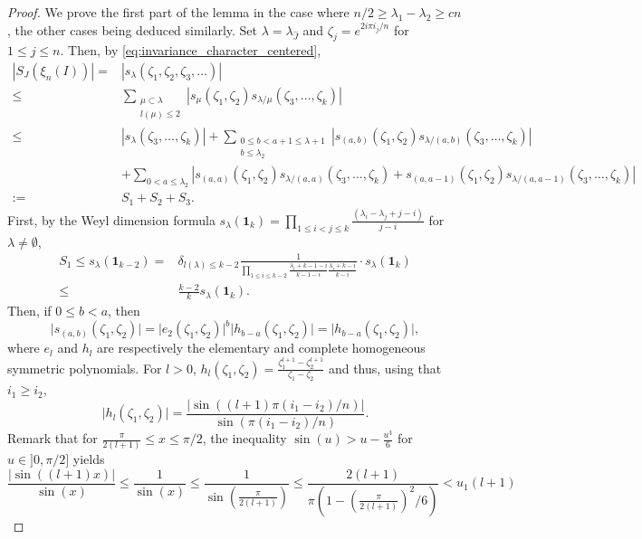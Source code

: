 \documentclass[10pt,11pt]{amsart}%
\def \b{\beta}
\def \l{\lambda}
\begin{document}
\begin{proof}
We prove the first part of the lemma in the case where $n/2\geq \lambda_1-\lambda_{2}\geq cn$, the other cases being deduced similarly. Set $\lambda=\lambda_{\hat{J}}$ and $\zeta_j=e^{2i\pi i_j/n}$ for $1\leq j\leq n$. Then, by \eqref{eq:invariance_character_centered},
\begin{align*}
\left\vert S_{J}(\xi_{n}(I))\right\vert=&\left\vert s_{\lambda}(\zeta_1,\zeta_2,\zeta_3,\ldots)\right\vert\\
\leq&\sum_{\substack{\mu\subset \lambda\\l(\mu)\leq 2}}\left\vert s_{\mu}(\zeta_1,\zeta_2)s_{\lambda/\mu}(\zeta_3,\ldots,\zeta_{k})\right\vert\\
\leq&\left\vert s_{\lambda}(\zeta_3,\ldots,\zeta_{k})\right\vert+\sum_{\substack{0\leq b< a+1\leq \lambda+1\\b\leq \lambda_2}}\left\vert s_{(a,b)}(\zeta_1,\zeta_2)s_{\lambda/(a,b)}(\zeta_3,\ldots,\zeta_{k})\right\vert\\
&+\sum_{0<a\leq \lambda_2}\left\vert s_{(a,a)}(\zeta_1,\zeta_2)s_{\lambda/(a,a)}(\zeta_3,\ldots,\zeta_{k})+s_{(a,a-1)}(\zeta_1,\zeta_2)s_{\lambda/(a,a-1)}(\zeta_3,\ldots,\zeta_{k})\right\vert\\
:=&S_1+S_2+S_3.
\end{align*}
First, by the Weyl dimension formula $s_{\lambda}(\mathbf{1}_k)=\prod_{1\leq i<j\leq k}\frac{(\lambda_i-\lambda_j+j-i)}{j-i}$ for $\lambda\not=\emptyset$,
\begin{align}
S_1\leq s_{\lambda}(\mathbf{1}_{k-2})=&\delta_{l(\lambda)\leq k-2}\frac{1}{\prod_{1\leq i\leq k-2}\frac{\lambda_i+k-1-i}{k-1-i}\frac{\lambda_i+k-i}{k-i}}\cdot s_{\lambda}(\mathbf{1}_{k})\nonumber\\
\leq &\frac{k-2}{k}s_{\lambda}(\mathbf{1}_{k}).\label{eq:lemma_large_S_1}
\end{align}
Then, if $0\leq b< a$, then 
$$\vert s_{(a,b)}(\zeta_1,\zeta_2)\vert=\vert e_2(\zeta_1,\zeta_2)\vert^b\vert h_{b-a}(\zeta_1,\zeta_2)\vert=\vert h_{b-a}(\zeta_1,\zeta_2)\vert,$$
where $e_l$ and $h_l$ are respectively the elementary and complete homogeneous symmetric polynomials. For $l>0$, $h_l(\zeta_1,\zeta_2)=\frac{\zeta_1^{l+1}-\zeta_2^{l+1}}{\zeta_1-\zeta_2}$ and thus, using that $i_1\geq i_2$,
$$\vert h_l(\zeta_1,\zeta_2)\vert =\frac{\vert \sin((l+1)\pi(i_1-i_2)/n)\vert}{\sin(\pi(i_1-i_2)/n)}.$$
Remark that for $\frac{\pi}{2(l+1)}\leq x\leq \pi/2$, the inequality $\sin(u)>u-\frac{u^3}{6}$ for $u\in]0,\pi/2]$ yields
$$\frac{\vert\sin((l+1)x)\vert}{\sin(x)}\leq \frac{1}{\sin(x)}\leq \frac{1}{\sin\left(\frac{\pi}{2(l+1)}\right)}\leq \frac{2(l+1)}{\pi\left(1-\left(\frac{\pi}{2(l+1)}\right)^2/6\right)}<u_1(l+1)$$

\end{proof}
\end{document}
